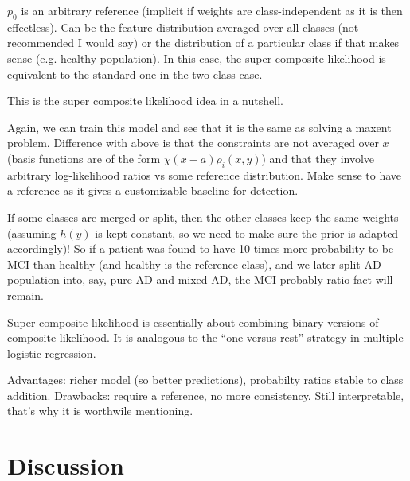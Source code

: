 \documentclass[english]{scrartcl}
\begin{document}
$p_0$ is an arbitrary reference (implicit if weights are class-independent as it is then effectless). Can be the feature distribution averaged over all classes (not recommended I would say) or the distribution of a particular class if that makes sense (e.g. healthy population). In this case, the super composite likelihood is equivalent to the standard one in the two-class case.

This is the super composite likelihood idea in a nutshell.

Again, we can train this model and see that it is the same as solving a maxent problem. Difference with above is that the constraints are not averaged over $x$ (basis functions are of the form $\chi(x-a)\rho_i(x,y)$) and that they involve arbitrary log-likelihood ratios vs some reference distribution. Make sense to have a reference as it gives a customizable baseline for detection.

If some classes are merged or split, then the other classes keep the same weights (assuming $h(y)$ is kept constant, so we need to make sure the prior is adapted accordingly)! So if a patient was found to have 10 times more probability to be MCI than healthy (and healthy is the reference class), and we later split AD population into, say, pure AD and mixed AD, the MCI probably ratio fact will remain.

Super composite likelihood is essentially about combining binary versions of composite likelihood. It is analogous to the ``one-versus-rest'' strategy in multiple logistic regression. 


Advantages: richer model (so better predictions), probabilty ratios stable to class addition. Drawbacks: require a reference, no more consistency. Still interpretable, that's why it is worthwile mentioning.




\section{Discussion}
\label{sec:discussion}
\end{document}
